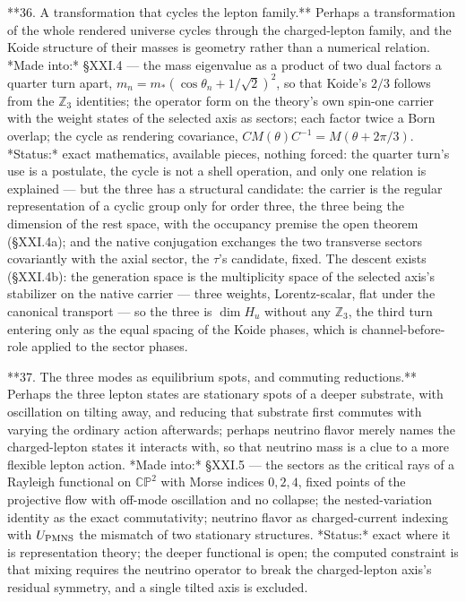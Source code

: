 **36. A transformation that cycles the lepton family.** Perhaps a transformation of the whole rendered universe cycles through the charged-lepton family, and the Koide structure of their masses is geometry rather than a numerical relation. *Made into:* §XXI.4 — the mass eigenvalue as a product of two dual factors a quarter turn apart, $m_n = m_*(\cos\theta_n+1/\sqrt2)^2$, so that Koide's $2/3$ follows from the $\mathbb Z_3$ identities; the operator form on the theory's own spin-one carrier with the weight states of the selected axis as sectors; each factor twice a Born overlap; the cycle as rendering covariance, $CM(\theta)C^{-1} = M(\theta+2\pi/3)$. *Status:* exact mathematics, available pieces, nothing forced: the quarter turn's use is a postulate, the cycle is not a shell operation, and only one relation is explained — but the three has a structural candidate: the carrier is the regular representation of a cyclic group only for order three, the three being the dimension of the rest space, with the occupancy premise the open theorem (§XXI.4a); and the native conjugation exchanges the two transverse sectors covariantly with the axial sector, the $\tau$'s candidate, fixed. The descent exists (§XXI.4b): the generation space is the multiplicity space of the selected axis's stabilizer on the native carrier — three weights, Lorentz-scalar, flat under the canonical transport — so the three is $\dim H_u$ without any $\mathbb Z_3$, the third turn entering only as the equal spacing of the Koide phases, which is channel-before-role applied to the sector phases.

**37. The three modes as equilibrium spots, and commuting reductions.** Perhaps the three lepton states are stationary spots of a deeper substrate, with oscillation on tilting away, and reducing that substrate first commutes with varying the ordinary action afterwards; perhaps neutrino flavor merely names the charged-lepton states it interacts with, so that neutrino mass is a clue to a more flexible lepton action. *Made into:* §XXI.5 — the sectors as the critical rays of a Rayleigh functional on $\mathbb{CP}^2$ with Morse indices $0,2,4$, fixed points of the projective flow with off-mode oscillation and no collapse; the nested-variation identity as the exact commutativity; neutrino flavor as charged-current indexing with $U_{\rm PMNS}$ the mismatch of two stationary structures. *Status:* exact where it is representation theory; the deeper functional is open; the computed constraint is that mixing requires the neutrino operator to break the charged-lepton axis's residual symmetry, and a single tilted axis is excluded.

